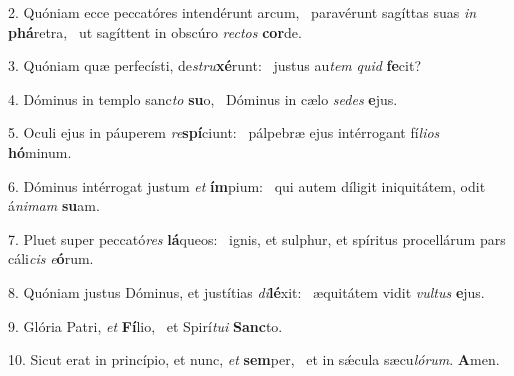 2. Quóniam ecce peccatóres intendérunt arcum, \dag\  paravérunt sagíttas suas \textit{in} \textbf{phá}retra, \ast\  ut sagíttent in obscúro \textit{rec}\textit{tos} \textbf{cor}de.\

3. Quóniam quæ perfecísti, de\textit{stru}\textbf{xé}runt: \ast\  justus au\textit{tem} \textit{quid} \textbf{fe}cit?\

4. Dóminus in templo sanc\textit{to} \textbf{su}o, \ast\  Dóminus in cælo \textit{se}\textit{des} \textbf{e}jus.\

5. Oculi ejus in páuperem \textit{re}\textbf{spí}ciunt: \ast\  pálpebræ ejus intérrogant fí\textit{li}\textit{os} \textbf{hó}minum.\

6. Dóminus intérrogat justum \textit{et} \textbf{ím}pium: \ast\  qui autem díligit iniquitátem, odit á\textit{ni}\textit{mam} \textbf{su}am.\

7. Pluet super peccató\textit{res} \textbf{lá}queos: \ast\  ignis, et sulphur, et spíritus procellárum pars cáli\textit{cis} \textit{e}\textbf{ó}rum.\

8. Quóniam justus Dóminus, et justítias \textit{di}\textbf{lé}xit: \ast\  æquitátem vidit \textit{vul}\textit{tus} \textbf{e}jus.\

9. Glória Patri, \textit{et} \textbf{Fí}lio, \ast\  et Spirí\textit{tu}\textit{i} \textbf{Sanc}to.\

10. Sicut erat in princípio, et nunc, \textit{et} \textbf{sem}per, \ast\  et in sǽcula sæcu\textit{ló}\textit{rum}. \textbf{A}men.\

